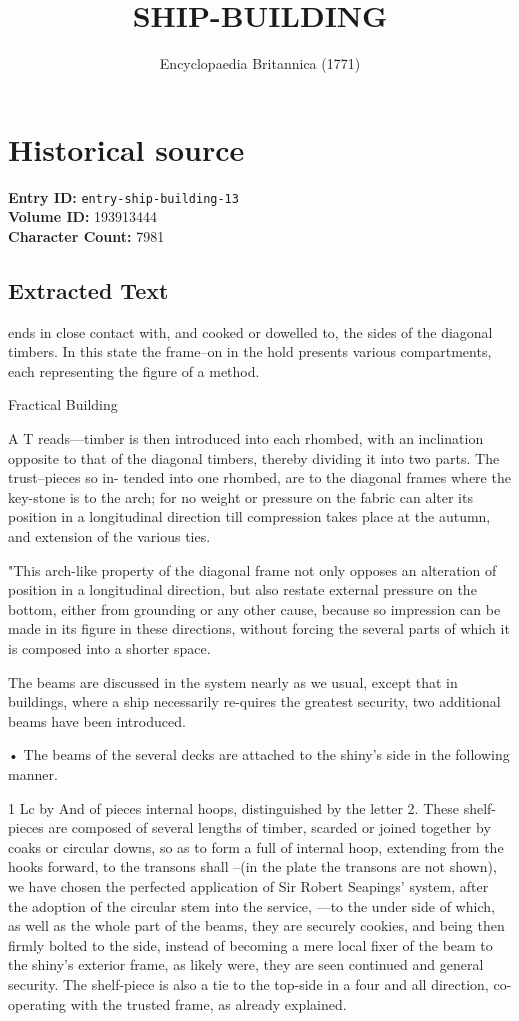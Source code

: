 \documentclass{article}
\title{SHIP-BUILDING}
\date{Encyclopaedia Britannica (1771)}
\begin{document}
\maketitle

\section*{Historical source}
\textbf{Entry ID:} \texttt{entry-ship-building-13} \\
\textbf{Volume ID:} 193913444 \\
\textbf{Character Count:} 7981

\subsection*{Extracted Text}
ends in close contact with, and cooked or dowelled to, the sides of the diagonal timbers. In this state the frame--on in the hold presents various compartments, each representing the figure of a method.

Fractical Building

A T reads—timber is then introduced into each rhombed, with an inclination opposite to that of the diagonal timbers, thereby dividing it into two parts. The trust--pieces so in- tended into one rhombed, are to the diagonal frames where the key-stone is to the arch; for no weight or pressure on the fabric can alter its position in a longitudinal direction till compression takes place at the autumn, and extension of the various ties.

"This arch-like property of the diagonal frame not only opposes an alteration of position in a longitudinal direction, but also restate external pressure on the bottom, either from grounding or any other cause, because so impression can be made in its figure in these directions, without forcing the several parts of which it is composed into a shorter space.

The beams are discussed in the system nearly as we usual, except that in buildings, where a ship necessarily re-quires the greatest security, two additional beams have been introduced.

• The beams of the several decks are attached to the shiny’s side in the following manner.

1 Lc by And of pieces internal hoops, distinguished by the letter 2. These shelf-pieces are composed of several lengths of timber, scarded or joined together by coaks or circular downs, so as to form a full of internal hoop, extending from the hooks forward, to the transons shall --(in the plate the transons are not shown), we have chosen the perfected application of Sir Robert Seapings’ system, after the adoption of the circular stem into the service, —to the under side of which, as well as the whole part of the beams, they are securely cookies, and being then firmly bolted to the side, instead of becoming a mere local fixer of the beam to the shiny’s exterior frame, as likely were, they are seen continued and general security. The shelf-piece is also a tie to the top-side in a four and all direction, co-operating with the trusted frame, as already explained.
\end{document}
